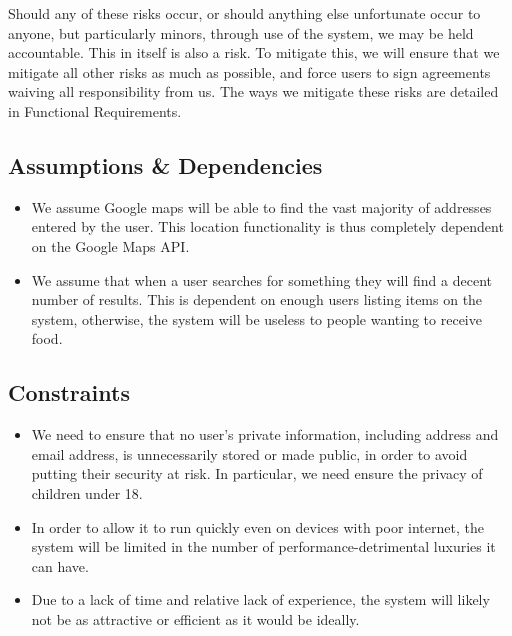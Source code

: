 \documentclass[12pt]{article}
\begin{document}
Should any of these risks occur, or should anything else unfortunate occur to anyone, but particularly minors, through use of the system, we may be held accountable. This in itself is also a risk. To mitigate this, we will ensure that we mitigate all other risks as much as possible, and force users to sign agreements waiving all responsibility from us. The ways we mitigate these risks are detailed in Functional Requirements.

\subsection{Assumptions \& Dependencies}
\begin{itemize}

    \item We assume Google maps will be able to find the vast majority of addresses entered by the user. This location functionality is thus completely dependent on the Google Maps API.

    \item We assume that when a user searches for something they will find a decent number of results. This is dependent on enough users listing items on the system, otherwise, the system will be useless to people wanting to receive food.

\end{itemize}

\subsection{Constraints}
\begin{itemize}

\item We need to ensure that no user’s private information, including address and email address, is unnecessarily stored or made public, in order to avoid putting their security at risk. In particular, we need ensure the privacy of children under 18.

\item In order to allow it to run quickly even on devices with poor internet, the system will be limited in the number of performance-detrimental luxuries it can have.

\item Due to a lack of time and relative lack of experience, the system will likely not be as attractive or efficient as it would be ideally.

\end{itemize}
\end{document}
